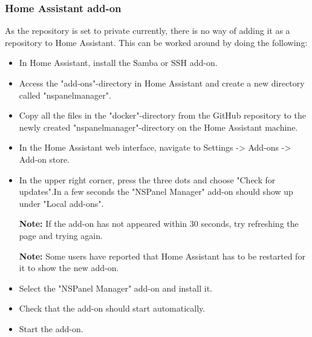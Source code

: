 \documentclass[10pt]{article}
\newcommand{\note}[1]{\begin{noteBox} \textbf{Note:} #1 \end{noteBox}}
\begin{document}
    \subsubsection{Home Assistant add-on}
    As the repository is set to private currently, there is no way of adding it as a repository to Home Assistant. This can be worked around by doing the following:
    \begin{itemize}
      \item In Home Assistant, install the Samba or SSH add-on.
      \item Access the "add-ons"-directory in Home Assistant and create a new directory called "nspanelmanager".
      \item Copy all the files in the "docker"-directory from the GitHub repository to the newly created "nspanelmanager"-directory on the Home Assistant machine.
      \item In the Home Assistant web interface, navigate to Settings -> Add-ons -> Add-on store.
      \item In the upper right corner, press the three dots and choose "Check for updates".In a few seconds the "NSPanel Manager" add-on should show up under "Local add-ons".
      \note{If the add-on has not appeared within 30 seconds, try refreshing the page and trying again.}
      \note{Some users have reported that Home Assistant has to be restarted for it to show the new add-on.}
      \item Select the "NSPanel Manager" add-on and install it.
      \item Check that the add-on should start automatically.
      \item Start the add-on.
    \end{itemize}
\end{document}
